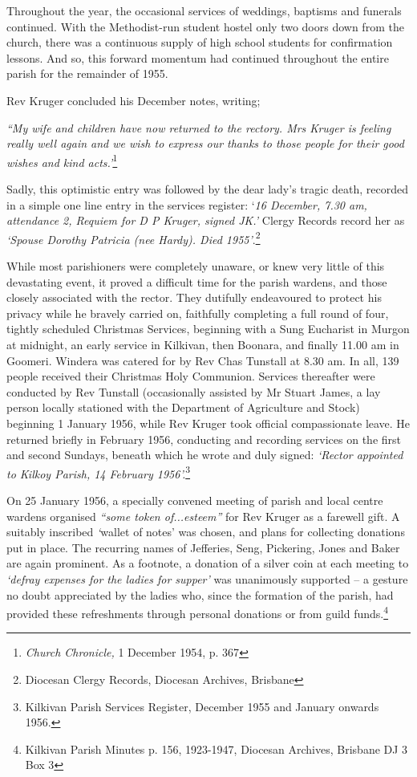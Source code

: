 Throughout the year, the occasional services of weddings, baptisms and funerals continued. With the Methodist-run student hostel only two doors down from the church, there was a continuous supply of high school students for confirmation lessons. And so, this forward momentum had continued throughout the entire parish for the remainder of 1955.



Rev Kruger concluded his December notes, writing;



\emph{``My wife and children have now returned to the rectory. Mrs Kruger is feeling really well again and we wish to express our thanks to those people for their good wishes and kind acts.'}\footnote{\emph{Church Chronicle,} 1 December 1954, p. 367}


\smallskip


Sadly, this optimistic entry was followed by the dear lady's tragic death, recorded in a simple one line entry in the services register: `\emph{16 December, 7.30 am, attendance 2, Requiem for D P Kruger, signed JK.'} Clergy Records record her as \emph{`Spouse Dorothy Patricia (nee Hardy). Died 1955'}.\footnote{Diocesan Clergy Records, Diocesan Archives, Brisbane}


\smallskip


While most parishioners were completely unaware, or knew very little of this devastating event, it proved a difficult time for the parish wardens, and those closely associated with the rector. They dutifully endeavoured to protect his privacy while he bravely carried on, faithfully completing a full round of four, tightly scheduled Christmas Services, beginning with a Sung Eucharist in Murgon at midnight, an early service in Kilkivan, then Boonara, and finally 11.00 am in Goomeri. Windera was catered for by Rev Chas Tunstall at 8.30 am. In all, 139 people received their Christmas Holy Communion. Services thereafter were conducted by Rev Tunstall (occasionally assisted by Mr Stuart James, a lay person locally stationed with the Department of Agriculture and Stock) beginning 1 January 1956, while Rev Kruger took official compassionate leave. He returned briefly in February 1956, conducting and recording services on the first and second Sundays, beneath which he wrote and duly signed: \emph{`Rector appointed to Kilkoy Parish, 14 February 1956'.}\footnote{Kilkivan Parish Services Register, December 1955 and January onwards 1956.}


On 25 January 1956, a specially convened meeting of parish and local centre wardens organised \emph{``some token of...esteem''} for Rev Kruger as a farewell gift. A suitably inscribed \emph{`}wallet of notes' was chosen, and plans for collecting donations put in place. The recurring names of Jefferies, Seng, Pickering, Jones and Baker are again prominent. As a footnote, a donation of a silver coin at each meeting to \emph{`defray expenses for the ladies for supper'} was unanimously supported -- a gesture no doubt appreciated by the ladies who, since the formation of the parish, had provided these refreshments through personal donations or from guild funds.\footnote{Kilkivan Parish Minutes p. 156, 1923-1947, Diocesan Archives, Brisbane DJ 3 Box 3}


